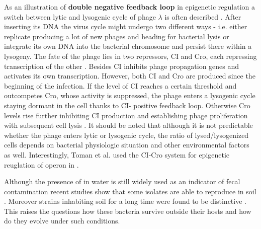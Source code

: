 As an illustration of \textbf{double negative feedback loop} in epigenetic regulation a switch between lytic and lysogenic cycle of  phage $\lambda$ is often described \cite{smits2006phenotypic, casadesus2013programmed}.
After inserting its DNA the virus cycle might undergo two different ways - i.e. either replicate producing a lot of new phages and heading for bacterial lysis or integrate its own DNA into the bacterial chromosome and persist there within a lysogeny.
The fate of the phage lies in two repressors, CI and Cro, each repressing transcription of the other \cite{eisen1970regulation, neubauer1970immunity}.
Besides CI inhibits phage propagation genes and activates its own transcription.
However, both CI and Cro are produced since the beginning of the infection.
If the level of CI reaches a certain threshold and outcompetes Cro, whose activity is suppressed, the phage enters a lysogenic cycle staying dormant in the cell thanks to CI- positive feedback loop.
Otherwise Cro levels rise further inhibiting CI production and establishing phage proliferation with subsequent cell lysis \cite{svenningsen2005role}.
It should be noted that although it is not predictable whether the phage enters lytic or lysogenic cycle, the ratio of lysed/lysogenized cells depends on bacterial physiologic situation and other environmental factors as well.
Interestingly, Toman et al. used the CI-Cro system for epigenetic reuglation of  operon in  \cite{toman1985system}.




Although the presence of  in water is still widely used as an indicator of fecal contamination recent studies show that some  isolates are able to  reproduce in soil \cite{byappanahalli2004indigenous, somorin2016general}.
Moreover strains inhabiting soil for a long time were found to be distinctive \cite{walk2009cryptic, walk2015cryptic}.
This raises the questions how these bacteria survive outside their hosts and how do they evolve under such conditions.




\cleardoublepage

